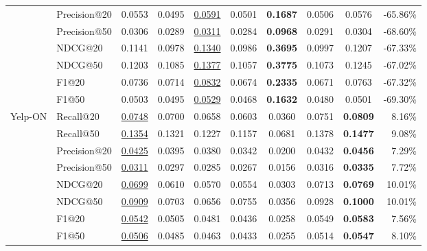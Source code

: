 \begin{table*}[]
{\begin{tabular}{@{}l|l|cccccc|cr@{}}
                        & Precision@20 & 0.0553       & 0.0495       & {\ul{0.0591}}    & 0.0501 & \textbf{0.1687} & 0.0506 & 0.0576          & -65.86\% \\
                        & Precision@50 & 0.0306       & 0.0289       & {\ul{0.0311}}    & 0.0284 & \textbf{0.0968} & 0.0291 & 0.0304          & -68.60\% \\
                        & NDCG@20      & 0.1141       & 0.0978       & {\ul {0.1340}}    & 0.0986 & \textbf{0.3695} & 0.0997 & 0.1207          & -67.33\% \\
                        & NDCG@50      & 0.1203       & 0.1085       & {\ul {0.1377}}    & 0.1057 & \textbf{0.3775} & 0.1073 & 0.1245          & -67.02\% \\
                        & F1@20        & 0.0736       & 0.0714       & {\ul {0.0832}}    & 0.0674 & \textbf{0.2335} & 0.0671 & 0.0763          & -67.32\% \\
                        & F1@50        & 0.0503       & 0.0495       & {\ul {0.0529}}    & 0.0468 & \textbf{0.1632} & 0.0480 & 0.0501          & -69.30\% \\ \midrule
\multirow{8}{*}{Yelp-ON} & Recall@20    & {\ul {0.0748}} & 0.0700       & 0.0658          & 0.0603 & 0.0360          & 0.0751 & \textbf{0.0809} & 8.16\% \\
                        & Recall@50    & {\ul {0.1354}} & 0.1321       & 0.1227          & 0.1157 & 0.0681          & 0.1378 & \textbf{0.1477} & 9.08\% \\
                        & Precision@20 & {\ul {0.0425}} & 0.0395       & 0.0380          & 0.0342 & 0.0200          & 0.0432 & \textbf{0.0456} & 7.29\% \\
                        & Precision@50 & {\ul {0.0311}} & 0.0297       & 0.0285          & 0.0267 & 0.0156          & 0.0316 & \textbf{0.0335} & 7.72\% \\
                        & NDCG@20      & {\ul {0.0699}} & 0.0610       & 0.0570          & 0.0554 & 0.0303          & 0.0713 & \textbf{0.0769} & 10.01\% \\
                        & NDCG@50      & {\ul {0.0909}} & 0.0703       & 0.0656          & 0.0755 & 0.0356          & 0.0928 & \textbf{0.1000} & 10.01\% \\
                        & F1@20        & {\ul {0.0542}} & 0.0505       & 0.0481          & 0.0436 & 0.0258          & 0.0549 & \textbf{0.0583} & 7.56\% \\
                        & F1@50        & {\ul {0.0506}} & 0.0485       & 0.0463          & 0.0433 & 0.0255          & 0.0514 & \textbf{0.0547} & 8.10\% \\ \midrule

\end{tabular}}
\end{table*}
